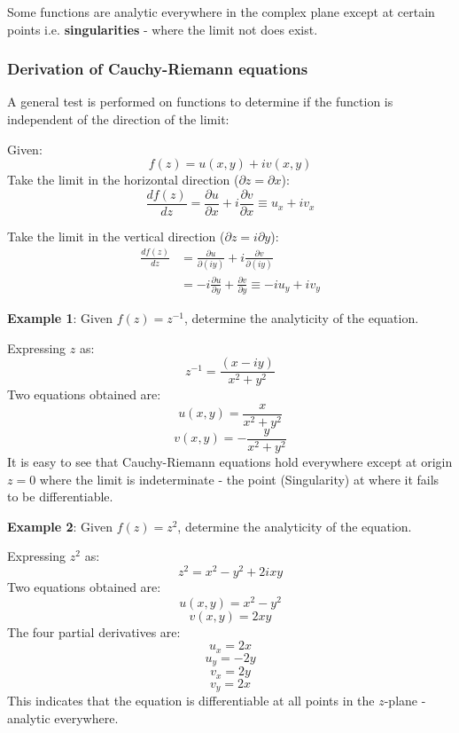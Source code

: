 \documentclass[10pt,a4paper]{article}
\begin{document}
Some functions are analytic everywhere in the complex plane except at certain points
i.e. \textbf{singularities} - where the limit not does exist.

\subsubsection{Derivation of Cauchy-Riemann equations}

A general test is performed on functions to determine if the function is independent of the
direction of the limit: \par 

Given: 
$$f(z)=u(x,y)+iv(x,y)$$
Take the limit in the horizontal direction ($\partial z = \partial x$):
$$\frac{df(z)}{dz}=\frac{\partial u}{\partial x}+i\frac{\partial v}{\partial x} \equiv u_x + iv_x$$

Take the limit in the vertical direction ($\partial z = i\partial y$):
\begin{equation*}  
    \begin{aligned}
        \frac{df(z)}{dz} &= \frac{\partial u}{\partial (iy)}+i\frac{\partial v}{\partial (iy)} \\
        &= -i\frac{\partial u}{\partial y} + \frac{\partial v}{\partial y} \equiv -iu_y + iv_y
    \end{aligned}
\end{equation*}

\textbf{Example 1}: Given $f(z)=z^{-1}$, determine the analyticity of the equation. \par 
Expressing $z$ as:
$$z^{-1}=\frac{(x-iy)}{x^2 + y^2}$$
Two equations obtained are: 
$$u(x,y)=\frac{x}{x^2+y^2}$$
$$v(x,y)=-\frac{y}{x^2+y^2}$$
It is easy to see that Cauchy-Riemann equations hold everywhere except at origin $z=0$ where the
limit is indeterminate - the point (Singularity) at where it fails to be differentiable. \par 

\textbf{Example 2}: Given $f(z)=z^2$, determine the analyticity of the equation. \par 
Expressing $z^2$ as:
$$z^{2}=x^2 - y^2 + 2ixy$$
Two equations obtained are: 
$$u(x,y)={x^2-y^2}$$
$$v(x,y)=2xy$$
The four partial derivatives are:
$$u_x=2x$$
$$u_y=-2y$$
$$v_x=2y$$
$$v_y=2x$$
This indicates that the equation is differentiable at all points in the $z$-plane - analytic
everywhere. 

\end{document}
